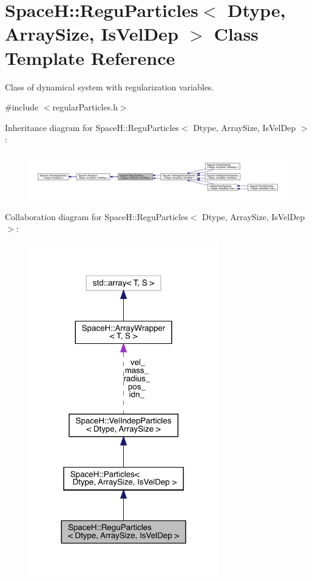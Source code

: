 \hypertarget{class_space_h_1_1_regu_particles}{}\section{SpaceH\+:\+:Regu\+Particles$<$ Dtype, Array\+Size, Is\+Vel\+Dep $>$ Class Template Reference}
\label{class_space_h_1_1_regu_particles}


Class of dynamical system with regularization variables.  




{\ttfamily \#include $<$regular\+Particles.\+h$>$}



Inheritance diagram for SpaceH\+:\+:Regu\+Particles$<$ Dtype, Array\+Size, Is\+Vel\+Dep $>$\+:
\nopagebreak
\begin{figure}[H]
\begin{center}
\leavevmode
\includegraphics[width=350pt]{class_space_h_1_1_regu_particles__inherit__graph}
\end{center}
\end{figure}


Collaboration diagram for SpaceH\+:\+:Regu\+Particles$<$ Dtype, Array\+Size, Is\+Vel\+Dep $>$\+:
\nopagebreak
\begin{figure}[H]
\begin{center}
\leavevmode
\includegraphics[width=233pt]{class_space_h_1_1_regu_particles__coll__graph}
\end{center}
\end{figure}
